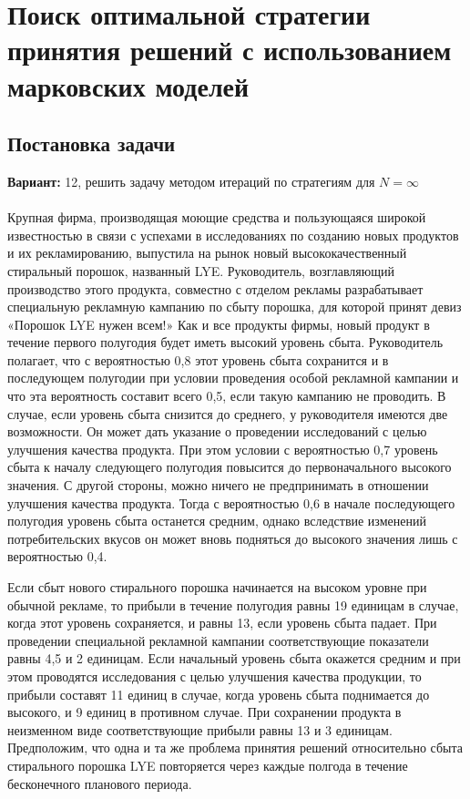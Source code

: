 \chapter{Поиск оптимальной стратегии принятия решений с использованием марковских моделей}
\section{Постановка задачи}
\textbf{Вариант:} 12, решить задачу методом итераций по стратегиям для $N=\infty$\\\\
Крупная фирма, производящая моющие средства и пользующаяся широкой известностью в связи с успехами в исследованиях по созданию новых продуктов и их рекламированию, выпустила на рынок новый высококачественный стиральный порошок, названный LYE. Руководитель, возглавляющий производство этого продукта, совместно с отделом рекламы разрабатывает специальную рекламную кампанию по сбыту порошка, для которой принят девиз «Порошок LYE нужен всем!» Как и все продукты фирмы, новый продукт в течение первого полугодия будет иметь высокий уровень сбыта. Руководитель полагает, что с вероятностью 0,8 этот уровень сбыта сохранится и в последующем полугодии при условии проведения особой рекламной кампании и что эта вероятность составит всего 0,5, если такую кампанию не проводить. В случае, если уровень сбыта снизится до среднего, у руководителя имеются две возможности. Он может дать указание о проведении исследований с целью улучшения качества продукта. При этом условии с вероятностью 0,7 уровень сбыта к началу следующего полугодия повысится до первоначального высокого значения. С другой стороны, можно ничего не предпринимать в отношении улучшения качества продукта. Тогда с вероятностью 0,6 в начале последующего полугодия уровень сбыта останется средним, однако вследствие изменений потребительских вкусов он может вновь подняться до высокого значения лишь с вероятностью 0,4.

Если сбыт нового стирального порошка начинается на высоком уровне при обычной рекламе, то прибыли в течение полугодия равны 19 единицам в случае, когда этот уровень сохраняется, и равны 13, если уровень сбыта падает. При проведении специальной рекламной кампании соответствующие показатели равны 4,5 и 2 единицам. Если начальный уровень сбыта окажется средним и при этом проводятся исследования с целью улучшения качества продукции, то прибыли составят 11 единиц в случае, когда уровень сбыта поднимается до высокого, и 9 единиц в противном случае. При сохранении продукта в неизменном виде соответствующие прибыли равны 13 и 3 единицам. Предположим, что одна и та же проблема принятия решений относительно сбыта стирального порошка LYE повторяется через каждые полгода в течение бесконечного планового периода.


